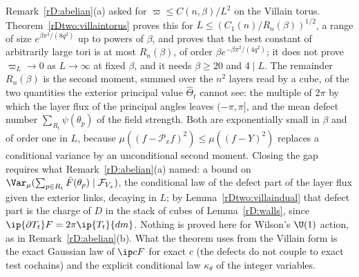 \begin{remark}
\label{rDtwo:villainremark}
Remark~\ref{rD:abelian}(a) asked for $\varpi\le C(n,\beta)/L^2$ on the Villain
torus. Theorem~\ref{rDtwo:villaintorus} proves this for $L\le(C_1(n)/R_n(
\beta))^{1/2}$, a range of size $e^{\beta\pi^2/(8q^2)}$ up to powers of
$\beta$, and proves that the best constant of arbitrarily large tori is at
most $R_n(\beta)$, of order $\beta e^{-\beta\pi^2/(4q^2)}$; it does not
prove $\varpi_L\to0$ as $L\to\infty$ at fixed $\beta$, and it needs
$\beta\ge20$ and $4\mid L$. The remainder $R_n(\beta)$ is the second
moment, summed over the $n^2$ layers read by a cube, of the two quantities
the exterior principal value $\hat\Theta_t$ cannot see: the multiple of
$2\pi$ by which the layer flux of the principal angles leaves $(-\pi,\pi]$,
and the mean defect number $\sum_{R_t}\psi(\theta_p)$ of the field strength.
Both are exponentially small in $\beta$ and of order one in $L$, because
$\mu((f-\mathcal P_xf)^2)\le\mu((f-Y)^2)$ replaces a conditional variance
by an unconditional second moment. Closing the gap requires what
Remark~\ref{rD:abelian}(a) named: a bound on $\Var_\mu(\sum_{p\in R_t}\bar F
(\theta_p)\mid\mathcal F_{V_x})$, the conditional law of the defect part of
the layer flux given the exterior links, decaying in $L$; by
Lemma~\ref{rDtwo:villaindual} that defect part is the charge of $D$ in the
stack of cubes of Lemma~\ref{rD:walls}, since $\ip{\partial T_t}F=2\pi\ip{T_t}
{dm}$. Nothing is proved here for Wilson's $\U(1)$ action, as in
Remark~\ref{rD:abelian}(b). What the theorem uses from the Villain form is
the exact Gaussian law of $\ip cF$ for exact $c$ (the defects do not couple
to exact test cochains) and the explicit conditional law $\kappa_\theta$ of
the integer variables.
\end{remark}

